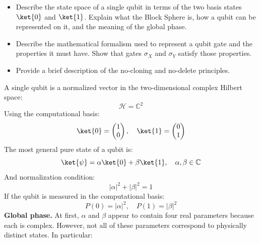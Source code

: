 \newpage

\noindent
{}
{}
\begin{itemize}
    \item Describe the state space of a single qubit in terms of the two basis states $\ket{0}$ and $\ket{1}$. Explain what the Block Sphere is, how a qubit can be represented on it, and the meaning of the global phase.

    \item Describe the mathematical formalism used to represent a qubit gate and the properties it must have. Show that gates $\sigma_X$ and $\sigma_Y$ satisfy those properties.

    \item Provide a brief description of the no-cloning and no-delete principles.
\end{itemize}
{}
 A single qubit is a normalized vector in the two-dimensional complex Hilbert space:
\begin{equation*}
    \mathcal{H} = \mathbb{C}^{2}
\end{equation*}
Using the computational basis:
\begin{equation*}
    \ket{0} =
    \begin{pmatrix}
        1 \\
        0
    \end{pmatrix},
    \quad
    \ket{1} =
    \begin{pmatrix}
        0 \\
        1
    \end{pmatrix}
\end{equation*}
The most general pure state of a qubit is:
\begin{equation*}
    \ket{\psi} = \alpha\ket{0} + \beta\ket{1}, \quad \alpha, \beta \in \mathbb{C}
\end{equation*}
And normalization condition:
\begin{equation*}
    |\alpha|^2 + |\beta|^2 = 1
\end{equation*}
If the qubit is measured in the computational basis:
\begin{equation*}
    P(0) = |\alpha|^2, \quad P(1) = |\beta|^2
\end{equation*}
\textbf{Global phase.} At first, $\alpha$ and $\beta$ appear to contain four real parameters because each is complex. However, not all of these parameters correspond to physically distinct states. In particular:
